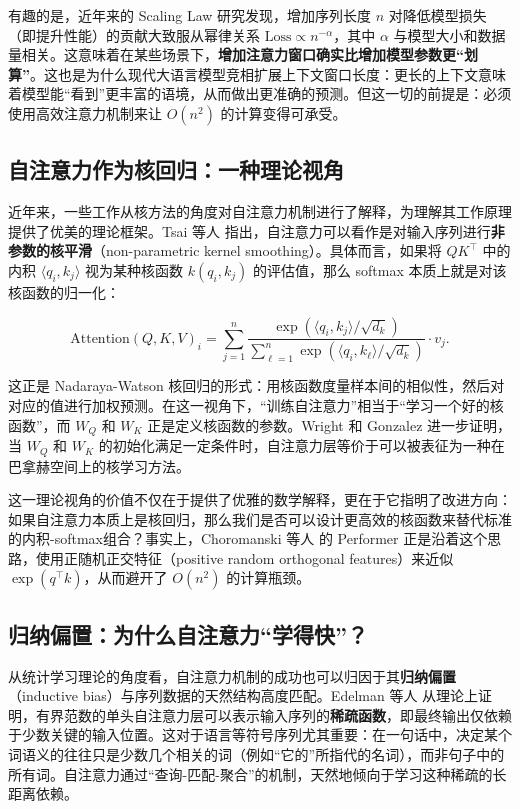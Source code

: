 有趣的是，近年来的 Scaling Law 研究发现\cite{kaplan2020scalinglawsneurallanguage}，增加序列长度 $n$ 对降低模型损失（即提升性能）的贡献大致服从幂律关系 $\text{Loss} \propto n^{-\alpha}$，其中 $\alpha$ 与模型大小和数据量相关。这意味着在某些场景下，\textbf{增加注意力窗口确实比增加模型参数更“划算”}。这也是为什么现代大语言模型竞相扩展上下文窗口长度：更长的上下文意味着模型能“看到”更丰富的语境，从而做出更准确的预测。但这一切的前提是：必须使用高效注意力机制来让 $O(n^2)$ 的计算变得可承受。

\subsection{自注意力作为核回归：一种理论视角}

近年来，一些工作从核方法的角度对自注意力机制进行了解释，为理解其工作原理提供了优美的理论框架。Tsai 等人\cite{tsai2019transformerdissectionunifiedunderstanding} 指出，自注意力可以看作是对输入序列进行\textbf{非参数的核平滑}（non-parametric kernel smoothing）。具体而言，如果将 $QK^\top$ 中的内积 $\langle q_i, k_j\rangle$ 视为某种核函数 $k(q_i, k_j)$ 的评估值，那么 softmax 本质上就是对该核函数的归一化：

\[
\text{Attention}(Q, K, V)_i = \sum_{j=1}^n \frac{\exp(\langle q_i, k_j\rangle / \sqrt{d_k})}{\sum_{\ell=1}^n \exp(\langle q_i, k_\ell\rangle / \sqrt{d_k})} \cdot v_j.
\]

这正是 Nadaraya-Watson 核回归的形式：用核函数度量样本间的相似性，然后对对应的值进行加权预测。在这一视角下，“训练自注意力”相当于“学习一个好的核函数”，而 $W_Q$ 和 $W_K$ 正是定义核函数的参数。Wright 和 Gonzalez\cite{wright2021transformersdeepinfinitedimensionalnonmercer} 进一步证明，当 $W_Q$ 和 $W_K$ 的初始化满足一定条件时，自注意力层等价于可以被表征为一种在巴拿赫空间上的核学习方法。

这一理论视角的价值不仅在于提供了优雅的数学解释，更在于它指明了改进方向：如果自注意力本质上是核回归，那么我们是否可以设计更高效的核函数来替代标准的内积-softmax组合？事实上，Choromanski 等人\cite{choromanski2022rethinkingattentionperformers} 的 Performer 正是沿着这个思路，使用正随机正交特征（positive random orthogonal features）来近似 $\exp(q^\top k)$，从而避开了 $O(n^2)$ 的计算瓶颈。

\subsection{归纳偏置：为什么自注意力“学得快”？}

从统计学习理论的角度看，自注意力机制的成功也可以归因于其\textbf{归纳偏置}（inductive bias）与序列数据的天然结构高度匹配。Edelman 等人\cite{edelman2022inductivebiasesvariablecreation} 从理论上证明，有界范数的单头自注意力层可以表示输入序列的\textbf{稀疏函数}，即最终输出仅依赖于少数关键的输入位置。这对于语言等符号序列尤其重要：在一句话中，决定某个词语义的往往只是少数几个相关的词（例如“它的”所指代的名词），而非句子中的所有词。自注意力通过“查询-匹配-聚合”的机制，天然地倾向于学习这种稀疏的长距离依赖。

